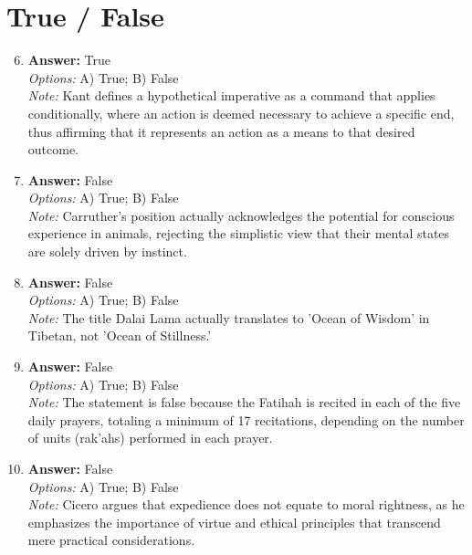 \documentclass[12pt]{article}
\begin{document}
\section*{True / False}
\begin{enumerate}[label=\arabic*.]
\setcounter{enumi}{5}
\item \textbf{Answer:} True
\\ \textit{Options:} A) True; B) False
\\ \textit{Note:} Kant defines a hypothetical imperative as a command that applies conditionally, where an action is deemed necessary to achieve a specific end, thus affirming that it represents an action as a means to that desired outcome.
\item \textbf{Answer:} False
\\ \textit{Options:} A) True; B) False
\\ \textit{Note:} Carruther's position actually acknowledges the potential for conscious experience in animals, rejecting the simplistic view that their mental states are solely driven by instinct.
\item \textbf{Answer:} False
\\ \textit{Options:} A) True; B) False
\\ \textit{Note:} The title Dalai Lama actually translates to 'Ocean of Wisdom' in Tibetan, not 'Ocean of Stillness.'
\item \textbf{Answer:} False
\\ \textit{Options:} A) True; B) False
\\ \textit{Note:} The statement is false because the Fatihah is recited in each of the five daily prayers, totaling a minimum of 17 recitations, depending on the number of units (rak'ahs) performed in each prayer.
\item \textbf{Answer:} False
\\ \textit{Options:} A) True; B) False
\\ \textit{Note:} Cicero argues that expedience does not equate to moral rightness, as he emphasizes the importance of virtue and ethical principles that transcend mere practical considerations.
\end{enumerate}
\end{document}
